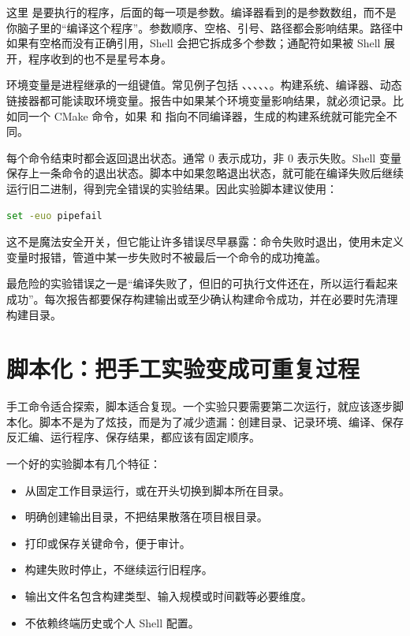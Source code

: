 这里  是要执行的程序，后面的每一项是参数。编译器看到的是参数数组，而不是你脑子里的“编译这个程序”。参数顺序、空格、引号、路径都会影响结果。路径中如果有空格而没有正确引用，Shell 会把它拆成多个参数；通配符如果被 Shell 展开，程序收到的也不是星号本身。

环境变量是进程继承的一组键值。常见例子包括 、、、、、。构建系统、编译器、动态链接器都可能读取环境变量。报告中如果某个环境变量影响结果，就必须记录。比如同一个 CMake 命令，如果  和  指向不同编译器，生成的构建系统就可能完全不同。

每个命令结束时都会返回退出状态。通常 0 表示成功，非 0 表示失败。Shell 变量  保存上一条命令的退出状态。脚本中如果忽略退出状态，就可能在编译失败后继续运行旧二进制，得到完全错误的实验结果。因此实验脚本建议使用：

\begin{lstlisting}[language=bash]
set -euo pipefail
\end{lstlisting}

这不是魔法安全开关，但它能让许多错误尽早暴露：命令失败时退出，使用未定义变量时报错，管道中某一步失败时不被最后一个命令的成功掩盖。

\begin{warningbox}
最危险的实验错误之一是“编译失败了，但旧的可执行文件还在，所以运行看起来成功”。每次报告都要保存构建输出或至少确认构建命令成功，并在必要时先清理构建目录。
\end{warningbox}

\section{脚本化：把手工实验变成可重复过程}

手工命令适合探索，脚本适合复现。一个实验只要需要第二次运行，就应该逐步脚本化。脚本不是为了炫技，而是为了减少遗漏：创建目录、记录环境、编译、保存反汇编、运行程序、保存结果，都应该有固定顺序。

一个好的实验脚本有几个特征：

\begin{itemize}
  \item 从固定工作目录运行，或在开头切换到脚本所在目录。
  \item 明确创建输出目录，不把结果散落在项目根目录。
  \item 打印或保存关键命令，便于审计。
  \item 构建失败时停止，不继续运行旧程序。
  \item 输出文件名包含构建类型、输入规模或时间戳等必要维度。
  \item 不依赖终端历史或个人 Shell 配置。
\end{itemize}

